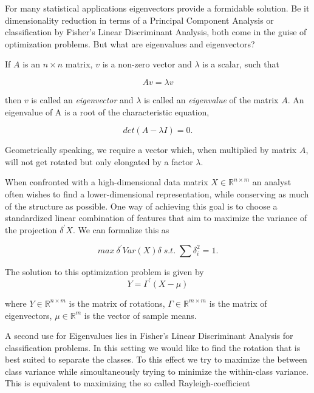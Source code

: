\documentclass[12pt]{article}
\begin{document}
For many statistical applications eigenvectors provide a formidable solution. Be it dimensionality reduction in terms of a Principal Component Analysis or classification by Fisher's Linear Discriminant Analysis, both come in the guise of optimization problems. But what are eigenvalues and eigenvectors? 

If $A$ is an $n \times n$ matrix, $v$ is a non-zero vector and $\lambda$ is a scalar, such that

\begin{equation}
\label{eigenvalue-def}
Av = \lambda v
\end{equation}

then $v$ is called an \textit{eigenvector} and $\lambda$ is called an \textit{eigenvalue} of the matrix $A$.
An eigenvalue of A is a root of the characteristic equation,

\begin{equation}
\label{eigenvalue-solve}
det\left(A - \lambda I \right) = 0.
\end{equation}

Geometrically speaking, we require a vector which, when multiplied by matrix $A$, will not get rotated but only elongated by a factor $\lambda$.

When confronted with a high-dimensional data matrix $X \in \mathbb{R}^{n \times m}$ an analyst often wishes to find a lower-dimensional representation, while conserving as much of the structure as possible. One way of achieving this goal is to choose a standardized linear combination of features that aim to maximize the variance of the projection $\delta^{\prime} X$. We can formalize this as

\begin{equation}
	\label{pca_obj}
    	max\ \delta^{\prime} Var \left(X\right) \delta \; s.t. \; \sum \delta_i^2 = 1.
\end{equation}

The solution to this optimization problem is given by
\begin{equation}
\label{pca_sol}
	Y = \Gamma^{\prime} \left(X - \mu\right)
\end{equation}

where $Y \in \mathbb{R}^{n \times m}$ is the matrix of rotations, 
	  $\Gamma \in \mathbb{R}^{m \times m}$ is the matrix of eigenvectors,
	  $\mu \in \mathbb{R}^m$ is the vector of sample means. \cite{MVA}

A second use for Eigenvalues lies in Fisher's Linear Discriminant Analysis for classification problems. In this setting we would like to find the rotation that is best suited to separate the classes. To this effect we try to maximize the between class variance while simoultaneously trying to minimize the within-class variance. This is equivalent to maximizing the so called Rayleigh-coefficient
\end{document}
